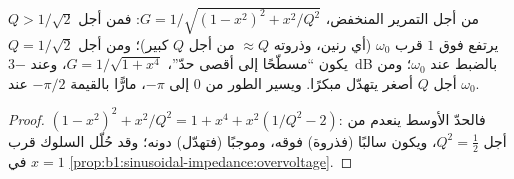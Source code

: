 \begin{proposition}\label{prop:b1:filters-transfer-functions:lowpass2}
من أجل التمرير المنخفض، $G = 1/\sqrt{(1 - x^2)^2 + x^2/Q^2}$: فمن أجل
$Q > 1/\sqrt2$ يرتفع  فوق $1$ قرب $\omega_0$ (أي رنين، وذروته
$\approx Q$ من أجل $Q$ كبير)؛ ومن أجل $Q = 1/\sqrt2$ يكون ``مسطّحًا إلى أقصى حدّ''،
$G = 1/\sqrt{1 + x^4}$، وعند \qty{-3}{dB} بالضبط عند $\omega_0$؛ ومن أجل $Q$ أصغر
يتهدّل مبكرًا. ويسير الطور من $0$ إلى $-\pi$، مارًّا بالقيمة $-\pi/2$
عند $\omega_0$.
\end{proposition}

\begin{proof}
$(1 - x^2)^2 + x^2/Q^2 = 1 + x^4 + x^2(1/Q^2 - 2)$: فالحدّ الأوسط
ينعدم من أجل $Q^2 = \tfrac12$، ويكون سالبًا (فذروة) فوقه، وموجبًا
(فتهدّل) دونه؛ وقد حُلّل السلوك قرب $x = 1$ في
\cref{prop:b1:sinusoidal-impedance:overvoltage}.
\end{proof}

